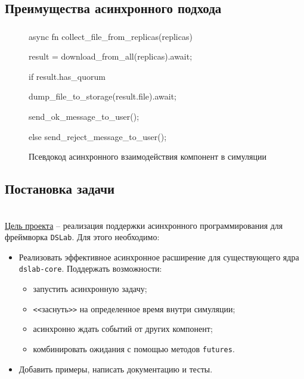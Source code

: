 \documentclass[t]{beamer}  %
\begin{document}
	\subsection{Преимущества асинхронного подхода}
	\begin{frame}[fragile]
		\frametitle{\insertsection} 
		\framesubtitle{\insertsubsection}

		\begin{figure}
			\footnotesize
			\centering
			\begin{rustcode}
async fn collect_file_from_replicas(replicas) {
  result = download_from_all(replicas).await;
	
  if result.has_quorum {
    dump_file_to_storage(result.file).await;

    send_ok_message_to_user();
  } else {
    send_reject_message_to_user();
  }
}
			\end{rustcode}
			\caption*{Псевдокод асинхронного взаимодействия компонент в симуляции}
		\end{figure}


	\end{frame}

	\subsection{Постановка задачи}
	\begin{frame}
		\frametitle{\insertsection} 
		\framesubtitle{\insertsubsection}

		\vspace{0.3cm}
		\begin{columns}
			\begin{column}{1.05\linewidth}
				\underline{Цель проекта} -- реализация поддержки асинхронного программирования для фреймворка \texttt{DSLab}. Для этого необходимо:
				\vspace{3pt}
				\begin{itemize}
					\setlength{\itemsep}{1em}
					\item Реализовать эффективное асинхронное расширение для существующего ядра \texttt{dslab-core}. Поддержать возможности:
					\begin{itemize}
						\item запустить асинхронную задачу;
						\item \texttt{<\textless}заснуть\texttt{>\textgreater} на определенное время внутри симуляции;
						\item асинхронно ждать событий от других компонент;
						\item комбинировать ожидания с помощью методов \texttt{futures}.
					\end{itemize}
					\item Добавить примеры, написать документацию и тесты.
				\end{itemize}
			\end{column}
		\end{columns}
	\end{frame}
\end{document}
